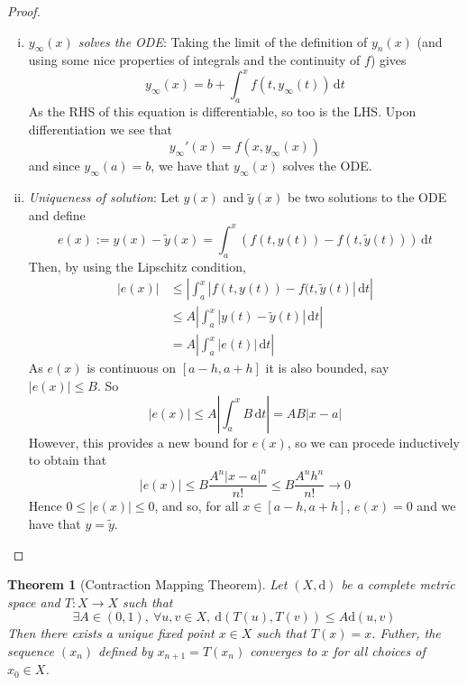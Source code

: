 \documentclass[10pt,fleqn]{article}
\newcommand{\diff}{\,\mathrm{d}}
\newcommand{\met}{\mathrm{d}}
\theoremstyle{definition} \newtheorem{defn}{Definition}[section]
\theoremstyle{plain}      \newtheorem{thm}[defn]{Theorem}
\theoremstyle{plain}      \newtheorem{lem}[defn]{Lemma}
\theoremstyle{definition} \newtheorem{prop}[defn]{Proposition}
\theoremstyle{definition} \newtheorem{cor}[defn]{Corollary}
\theoremstyle{definition} \newtheorem{ex}[defn]{Example}
\theoremstyle{definition} \newtheorem{rem}[defn]{Remark}
\begin{document}
\begin{proof}
\begin{enumerate}[(i)]
        \item \emph{$y_{\infty}(x)$ solves the ODE}:
        Taking the limit of the definition of $y_n(x)$ (and using some nice properties of integrals and the continuity of $f$) gives
        \[
            y_{\infty}(x)=
            b+\int_a^x f(t,y_{\infty}(t))\diff t
        \]
        As the RHS of this equation is differentiable, so too is the LHS.
        Upon differentiation we see that
        \[
            y_{\infty}'(x)=
            f(x,y_{\infty}(x))
        \]
        and since $y_{\infty}(a)=b$, we have that $y_{\infty}(x)$ solves the ODE.
        \item \emph{Uniqueness of solution}:
        Let $y(x)$ and $\tilde{y}(x)$ be two solutions to the ODE and define
        \[
            e(x):=
            y(x)-\tilde{y}(x)=
            \int_a^x(f(t,y(t))-f(t,\tilde{y}(t)))\diff t
        \]
        Then, by using the Lipschitz condition,
            \begin{align*}
                |e(x)|
                &\leq
                \left|\int_a^x |f(t,y(t))-f(t,\tilde{y}(t)|\diff t\right|\\
                &\leq
                A\left|\int_a^x |y(t)-\tilde{y}(t)|\diff t\right|\\
                &=
                A\left|\int_a^x |e(t)|\diff t\right|
            \end{align*}
        As $e(x)$ is continuous on $[a-h,a+h]$ it is also bounded, say $|e(x)|\leq B$.
        So
        \[
            |e(x)|\leq
            A\left|\int_a^x B\diff t\right|=
            AB|x-a|
        \]
        However, this provides a new bound for $e(x)$, so we can procede inductively to obtain that
        \[
            |e(x)|\leq
            B\frac{A^n|x-a|^n}{n!}\leq
            B\frac{A^nh^n}{n!}\to0
        \]
        Hence $0\leq |e(x)|\leq0$, and so, for all $x\in[a-h,a+h]$, $e(x)=0$ and we have that $y=\tilde{y}$.
    \end{enumerate}
\end{proof}

\begin{thm}[Contraction Mapping Theorem]
    Let $(X,\met)$ be a complete metric space and $T:X\to X$ such that
    \[
        \exists A\in(0,1),~
        \forall u,v\in X,~
        \met(T(u),T(v))\leq
        A\met(u,v)
    \]
    Then there exists a unique fixed point $x\in X$ such that $T(x)=x$.
    Futher, the sequence $(x_n)$ defined by $x_{n+1}=T(x_n)$ converges to $x$ for all choices of $x_0\in X$.
\end{thm}
\end{document}
